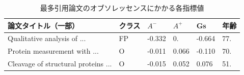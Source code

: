 \begin{table}
\begin{center}
\caption{最多引用論文のオブソレッセンスにかかる各指標値} \label{tab:mcpobsindex}
\begin{tabular}{llllll}
論文タイトル（一部）& クラス & $A^-$ & $A^+$ & Gs & 年齢 \\
\hline
Qualitative analysis of ... & FP & -0.332 & 0. & -0.664 & 77. \\
Protein measurement with ... & O & -0.011 & 0.066 & -0.110 & 70.  \\
Cleavage of structural proteins ... & O & -0.015 & 0.052 & 0.076 & 51.  \\
\end{tabular}
\end{center}
\end{table}
